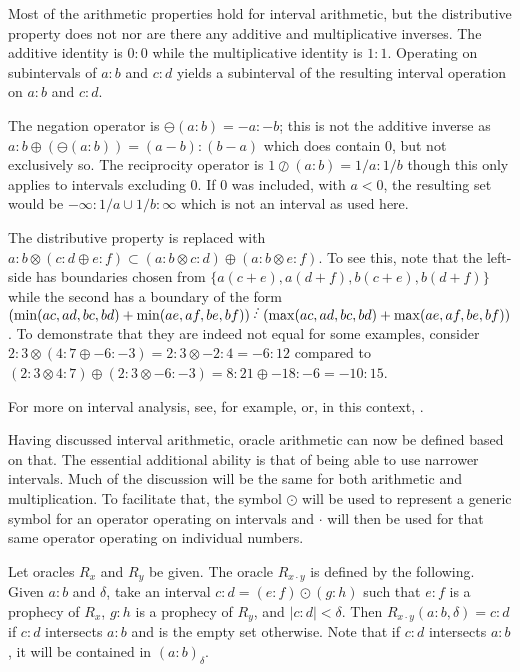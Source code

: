 \documentclass[12pt]{article}
\begin{document}
Most of the arithmetic properties hold for interval arithmetic, but the distributive property does not nor are there any additive and multiplicative inverses. The additive identity is $0:0$ while the multiplicative identity is $1:1$. Operating on subintervals of $a:b$ and $c:d$ yields a subinterval of the resulting interval operation on $a:b$ and $c:d$. 

The negation operator is $\ominus(a:b) = -a:-b$; this is not the additive inverse as $a:b \oplus (\ominus(a :b )) = (a-b):(b-a)$ which does contain 0, but not exclusively so. The reciprocity operator is $1 \oslash (a:b) = 1/a : 1/b$ though this only applies to intervals excluding 0. If 0 was included, with $a < 0$, the resulting set would be $-\infty:1/a \cup 1/b : \infty $ which is not an interval as used here.

The distributive property is replaced with $ a:b \otimes ( c:d \oplus e:f) \subset (a:b \otimes c:d) \oplus (a:b \otimes e:f)$. To see this, note that the left-side has boundaries chosen from $\{a(c+e), a(d+f), b(c+e), b(d+f)\}$ while the second has a boundary of the form $(\min(ac, ad, bc, bd) + \min(ae, af, be, bf) ) \lte (\max(ac, ad, bc, bd) + \max(ae, af, be, bf) )$. To demonstrate that they are indeed not equal for some examples, consider $2:3 \otimes ( 4:7 \oplus -6:-3) = 2:3 \otimes -2:4 = -6:12$ compared to $(2:3 \otimes 4:7) \oplus (2:3 \otimes -6:-3) = 8:21 \oplus -18:-6 = -10:15$. 

For more on interval analysis, see, for example, \cite{moore} or, in this context, \cite{taylor23main}.

Having discussed interval arithmetic, oracle arithmetic can now be defined based on that. The essential additional ability is that of being able to use narrower intervals. Much of the discussion will be the same for both arithmetic and multiplication. To facilitate that, the symbol $\odot$ will be used to represent a generic symbol for an operator operating on intervals and $\cdot$ will then be used for that same operator operating on individual numbers.

Let oracles $R_x$ and $R_y$ be given. The oracle $R_{x \cdot y}$ is defined by the following. Given $a:b$ and $\delta$, take an interval $c:d = (e:f) \odot (g:h)$ such that $e:f$ is a prophecy of $R_x$, $g:h$ is a prophecy of $R_y$, and $|c:d| < \delta$. Then $R_{x \cdot y}(a:b, \delta) = c:d$ if $c:d$ intersects $a:b$ and is the empty set otherwise. Note that if $c:d$ intersects $a:b$, it will be contained in $(a:b)_\delta$. 
\end{document}
